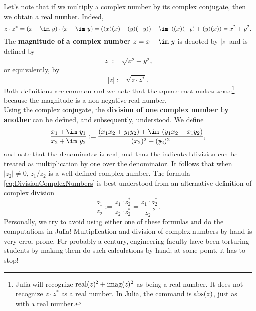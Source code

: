 Let's note that if we multiply a complex number by its complex conjugate, then we obtain a real number. Indeed, 
\begin{equation}
    \label{eq:MultiplicationComplexNumbersByConjugate}
   z \cdot z^\ast =  \left(x + \im~ y\right) \cdot \left( x - \im~ y \right) = \left((x)(x) -(y)(-y) \right) + \im~ \left( (x) (-y) + (y)(x)  \right) = x^2 + y^2.
\end{equation}
The \textbf{magnitude of a complex number} $z=x+\im~y$ is denoted by $|z|$ and is defined by
\begin{equation}
    \label{eq:MagnitudeComplexNumbers}
   |z| := \sqrt{x^2 + y^2},
\end{equation}
or equivalently, by
\begin{equation}
    \label{eq:MagnitudeComplexNumbers02}
   |z| :=\sqrt{z \cdot z^\ast}.
\end{equation}
Both definitions are common and we note that the square root makes sense\footnote{Julia will recognize $\mathrm{real} ( z )^2 + \mathrm{imag} ( z )^2$ as being a real number. It does not recognize $z \cdot z^\ast$ as a real number. In Julia, the command is ${\rm abs}(z)$, just as with a real number.} because the magnitude is a non-negative real number. \\

Using the complex conjugate, the \textbf{division of one complex number by another} can be defined, and subsequently, understood. We define 
\begin{equation}
    \label{eq:DivisionComplexNumbers}
    \frac {x_1 + \im~ y_1 }{x_2 + \im~ y_2 }: = \frac{\left(x_1 x_2 + y_1 y_2\right) +\im~\left(y_1 x_2 - x_1 y_2 \right)}{(x_2)^2 + (y_2)^2},
\end{equation}
and note that the denominator is real, and thus the indicated division can be treated as multiplication by one over the denominator. It follows that when $|z_2|\neq 0$, $z_1/z_2$ is a well-defined complex number. 
The formula \eqref{eq:DivisionComplexNumbers} is best understood from an alternative definition of complex division 
\begin{equation}
    \label{eq:DivisionComplexNumbers02}
   \frac{z_1}{z_2}:= \frac{z_1 \cdot z_2^\ast} {z_2 \cdot z_2^\ast} = \frac{z_1 \cdot z_2^\ast}{|z_2|^2}.
\end{equation}
Personally, we try to avoid using either one of these formulas and do the computations in Julia! Multiplication and division of complex numbers by hand is very error prone. For probably a century, engineering faculty have been torturing students by making them do such calculations by hand; at some point, it has to stop!\\

